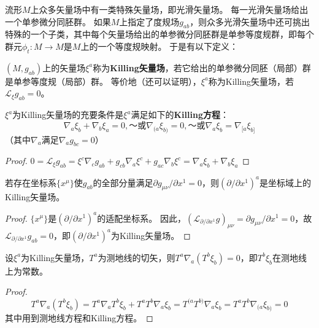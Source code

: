 流形$M$上众多矢量场中有一类特殊矢量场，即光滑矢量场。
每一光滑矢量场给出一个单参微分同胚群。
如果$M$上指定了度规场$g_{ab}$，则众多光滑矢量场中还可挑出特殊的一个子类，其中每个矢量场给出的单参微分同胚群是单参等度规群，即每个群元$\phi_t \colon M \to M$是$M$上的一个等度规映射。
于是有以下定义：

\begin{definition}
$(M, g_{ab})$上的矢量场$\xi^a$称为\textbf{Killing矢量场}，若它给出的单参微分同胚（局部）群是单参等度规（局部）群。
等价地（还可以证明），$\xi^a$称为Killing矢量场，若$\mathscr{L}_{\xi}g_{ab} = 0$。
\end{definition}

\begin{theorem}
$\xi^a$为Killing矢量场的充要条件是$\xi^a$满足如下的\textbf{Killing方程}：
$$\nabla_a\xi_b + \nabla_b\xi_a = 0, ～ \text{或} \nabla_{(a}\xi_{b)} = 0, ～ \text{或} \nabla_a\xi_b = \nabla_{[a}\xi_{b]}$$
（其中$\nabla_a$满足$\nabla_ag_{bc} = 0$）
\end{theorem}

\begin{proof}
$0 = \mathscr{L}_{\xi}g_{ab} = \xi^c\nabla_cg_{ab} + g_{cb}\nabla_a\xi^c + g_{ac}\nabla_b\xi^c = \nabla_a\xi_b + \nabla_b\xi_a$
\end{proof}

\begin{theorem}
若存在坐标系$\{x^\mu\}$使$g_{ab}$的全部分量满足$\partial g_{\mu\nu} / \partial x^1 = 0$，则$(\partial / \partial x^1)^a$是坐标域上的Killing矢量场。
\end{theorem}

\begin{proof}
$\{x^\mu\}$是$(\partial / \partial x^1)^a$的适配坐标系。
因此，$(\mathscr{L}_{\partial / \partial x^1}g)_{\mu\nu} = \partial g_{\mu\nu} / \partial x^1 = 0$，故$\mathscr{L}_{\partial / \partial x^1}g_{ab} = 0$，即$(\partial / \partial x^1)^a$为Killing矢量场。
\end{proof}

\begin{theorem}
设$\xi^a$为Killing矢量场，$T^a$为测地线的切矢，则$T^a\nabla_a(T^b\xi_b) = 0$，即$T^b\xi_b$在测地线上为常数。
\end{theorem}

\begin{proof}
$$T^a\nabla_a(T^b\xi_b) = T^a\nabla_aT^b\xi_b + T^aT^b\nabla_a\xi_b = T^{(a}T^{b)}\nabla_{a}\xi_{b} = T^{a}T^{b}\nabla_{(a}\xi_{b)} = 0$$
其中用到测地线方程和Killing方程。
\end{proof}


